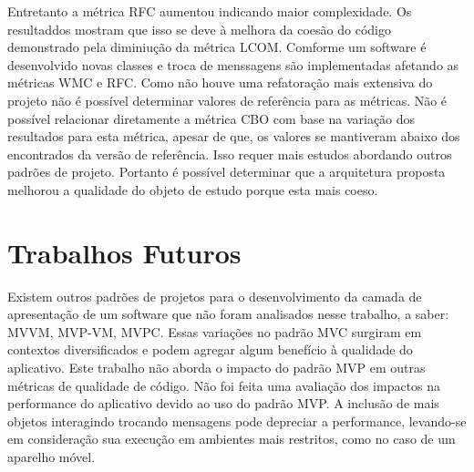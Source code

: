Entretanto a métrica RFC aumentou indicando maior complexidade. Os resultaddos
mostram que isso se deve à melhora da coesão do código demonstrado pela
diminiução da métrica LCOM. Comforme um software é desenvolvido novas classes e
troca de menssagens são implementadas afetando as métricas WMC e RFC. Como não
houve uma refatoração mais extensiva do projeto não é possível determinar
valores de referência para as métricas. Não é possível relacionar diretamente a
métrica CBO com base na variação dos resultados para esta métrica, apesar de
que, os valores se mantiveram abaixo dos encontrados da versão de referência.
Isso requer mais estudos abordando outros padrões de projeto. Portanto é possível
determinar que a arquitetura proposta melhorou a qualidade do objeto de estudo
porque esta mais coeso.


\section{Trabalhos Futuros}

Existem outros padrões de projetos para o desenvolvimento da camada de
apresentação de um software que não foram analisados nesse trabalho, a saber: 
MVVM, MVP-VM, MVPC. Essas variações no padrão MVC surgiram em contextos
diversificados e podem agregar algum benefício à qualidade do aplicativo.
Este trabalho não aborda o impacto do padrão MVP em outras métricas de qualidade
de código.
Não foi feita uma avaliação dos impactos na performance do aplicativo devido ao
uso do padrão MVP. A inclusão de mais objetos interagindo trocando mensagens
pode depreciar a performance, levando-se em consideração sua execução em
ambientes mais restritos, como no caso de um aparelho móvel.